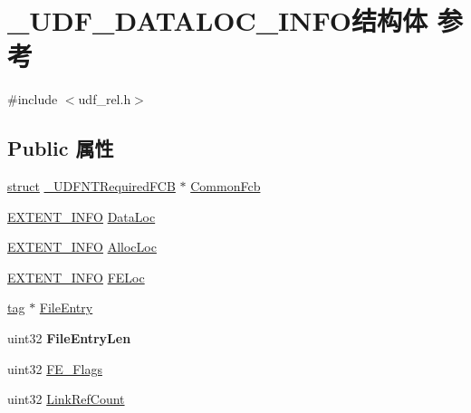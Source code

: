\hypertarget{struct___u_d_f___d_a_t_a_l_o_c___i_n_f_o}{}\section{\+\_\+\+U\+D\+F\+\_\+\+D\+A\+T\+A\+L\+O\+C\+\_\+\+I\+N\+F\+O结构体 参考}
\label{struct___u_d_f___d_a_t_a_l_o_c___i_n_f_o}


{\ttfamily \#include $<$udf\+\_\+rel.\+h$>$}

\subsection*{Public 属性}
\begin{DoxyCompactItemize}
\item 
\hyperlink{interfacestruct}{struct} \hyperlink{struct___u_d_f_n_t_required_f_c_b}{\+\_\+\+U\+D\+F\+N\+T\+Required\+F\+CB} $\ast$ \hyperlink{struct___u_d_f___d_a_t_a_l_o_c___i_n_f_o_aa16e04c294edf8f5cdf5e214c390c246}{Common\+Fcb}
\item 
\hyperlink{struct___e_x_t_e_n_t___i_n_f_o}{E\+X\+T\+E\+N\+T\+\_\+\+I\+N\+FO} \hyperlink{struct___u_d_f___d_a_t_a_l_o_c___i_n_f_o_a9515c0bbac1936572a7347ae50e7dd55}{Data\+Loc}
\item 
\hyperlink{struct___e_x_t_e_n_t___i_n_f_o}{E\+X\+T\+E\+N\+T\+\_\+\+I\+N\+FO} \hyperlink{struct___u_d_f___d_a_t_a_l_o_c___i_n_f_o_ade01a853270827c06a39f6b33db3f6a7}{Alloc\+Loc}
\item 
\hyperlink{struct___e_x_t_e_n_t___i_n_f_o}{E\+X\+T\+E\+N\+T\+\_\+\+I\+N\+FO} \hyperlink{struct___u_d_f___d_a_t_a_l_o_c___i_n_f_o_a412523da551f2c58ace14d1ca23b5ec8}{F\+E\+Loc}
\item 
\hyperlink{structtag}{tag} $\ast$ \hyperlink{struct___u_d_f___d_a_t_a_l_o_c___i_n_f_o_aaf8ffd0e631978872f812f5eae001efa}{File\+Entry}
\item 
\mbox{\label{struct___u_d_f___d_a_t_a_l_o_c___i_n_f_o_ae3453a52e16f8a1d939fd066bc9aa0ac}} 
uint32 {\bfseries File\+Entry\+Len}
\item 
uint32 \hyperlink{struct___u_d_f___d_a_t_a_l_o_c___i_n_f_o_a1b5650cc4b76759629799d5131b16d9f}{F\+E\+\_\+\+Flags}
\item 
uint32 \hyperlink{struct___u_d_f___d_a_t_a_l_o_c___i_n_f_o_ac573bac9d1c567842bbb5c68798927fb}{Link\+Ref\+Count}
\item 

\end{DoxyCompactItemize}
